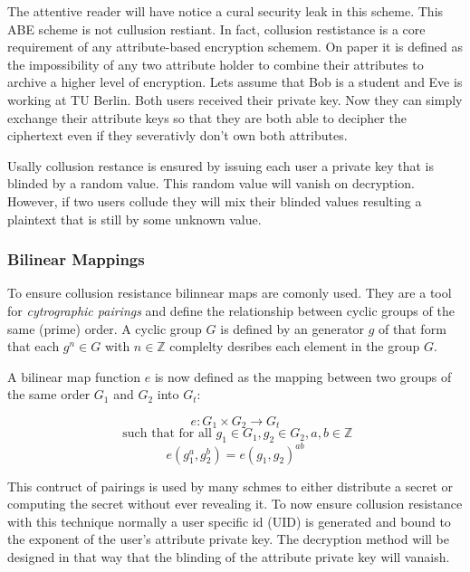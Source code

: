 The attentive reader will have notice a cural security leak in this scheme. This \ac{ABE} scheme is not cullusion restiant. In fact, collusion restistance is a core requirement of any attribute-based encryption schemem. On paper it is defined as the impossibility of any two attribute holder to combine their attributes to archive a higher level of encryption. Lets assume that Bob is a student and Eve is working at \ac{TU} Berlin. Both users received their private key. Now they can simply exchange their attribute keys so that they are both able to decipher the ciphertext even if they severativly don't own both attributes.  

Usally collusion restance is ensured by issuing each user a private key that is blinded by a random value. This random value will vanish on decryption. However, if two users collude they will mix their blinded values resulting a plaintext that is still by some unknown value. 

\subsubsection{Bilinear Mappings}
To ensure collusion resistance bilinnear maps are comonly used. They are a tool for \textit{cytrographic pairings} and define the relationship between cyclic groups of the same (prime) order. A cyclic group $G$ is defined by an generator $g$ of that form that each $g^n \in G$ with $n \in \mathbb{Z}$ complelty desribes each element in the group $G$.

A bilinear map function $e$ is now defined as the mapping between two groups of the same order $G_1$ and $G_2$ into $G_t$:

$$ e : G_1 \times G_2 \rightarrow G_t $$
$$\text{ such that for all } g_1 \in G_1, g_2 \in G_2, a, b \in \mathbb{Z}$$
$$e(g_1^a, g_2^b) = e(g_1, g_2)^{ab}$$


This contruct of pairings is used by many schmes to either distribute a secret or computing the secret without ever revealing it. To now ensure collusion resistance with this technique normally a user specific id (\ac{UID}) is generated and bound to the exponent of the user's attribute private key. The decryption method will be designed in that way that the blinding of the attribute private key will vanaish.   


